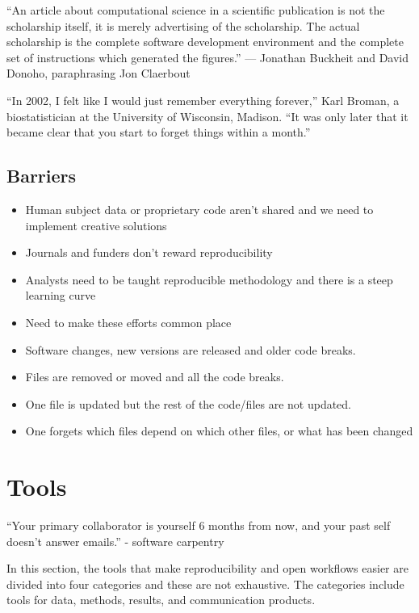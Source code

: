 \documentclass[
]{book}
\providecommand{\tightlist}{%
  \setlength{\itemsep}{0pt}\setlength{\parskip}{0pt}}
\begin{document}
``An article about computational science in a scientific publication is not the scholarship itself,
it is merely advertising of the scholarship. The actual scholarship is the complete software development environment and the complete set of instructions which generated the figures.''
--- Jonathan Buckheit and David Donoho, paraphrasing Jon Claerbout

``In 2002, I felt like I would just remember everything forever,'' Karl Broman, a biostatistician at the University of Wisconsin, Madison. ``It was only later that it became clear that you start to forget things within a month.''

\hypertarget{barriers}{%
\subsection{Barriers}\label{barriers}}

\begin{itemize}
\tightlist
\item
  Human subject data or proprietary code aren't shared and we need to implement creative solutions
\item
  Journals and funders don't reward reproducibility
\item
  Analysts need to be taught reproducible methodology and there is a steep learning curve
\item
  Need to make these efforts common place
\item
  Software changes, new versions are released and older code breaks.
\item
  Files are removed or moved and all the code breaks.
\item
  One file is updated but the rest of the code/files are not updated.
\item
  One forgets which files depend on which other files, or what has been changed
\end{itemize}

\hypertarget{tools}{%
\section{Tools}\label{tools}}

``Your primary collaborator is yourself 6 months from now, and your past self doesn't answer emails.'' - software carpentry

In this section, the tools that make reproducibility and open workflows easier are divided into four categories and these are not exhaustive. The categories include tools for data, methods, results, and communication products.
\end{document}
